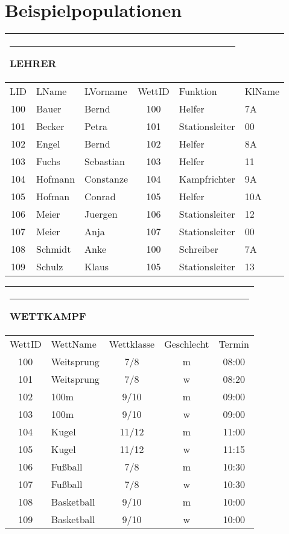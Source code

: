 \documentclass[pagesize,11pt,twoside]{scrartcl}
\def\TabKopf#1#2{\multicolumn{#2}{l}{\rule{1em}{0ex}\rule{0cm}{2.73ex}\textbf{#1}}\\\hline}
\begin{document}
\section{Beispielpopulationen}
\vspace*{-3ex}
\footnotesize\setlength{\tabcolsep}{2pt}
\begin{tabular}[t]{cllcll}
\TabKopf{LEHRER}{5}
LID&LName&LVorname&WettID&Funktion&KlName\\\hline
100&Bauer&Bernd		&100&Helfer	&7A\\
101&Becker&Petra	&101&Stationsleiter&00\\
102&Engel&Bernd		&102&Helfer	&8A\\
103&Fuchs&Sebastian	&103&Helfer	&11\\
104&Hofmann&Constanze	&104&Kampfrichter	&9A\\
105&Hofman&Conrad	&105&Helfer	&10A\\
106&Meier&Juergen	&106&Stationsleiter&12\\
107&Meier&Anja		&107&Stationsleiter&00\\
108&Schmidt&Anke	&100&Schreiber	&7A\\
109&Schulz&Klaus	&105&Stationsleiter&13
\end{tabular}\hfill
\begin{tabular}[t]{clccc}
\TabKopf{WETTKAMPF}{5}
 WettID&WettName&Wettklasse&Geschlecht&Termin\\\hline
100&Weitsprung&7/8&m&08:00\\
101&Weitsprung&7/8&w&08:20\\
102&100m&9/10&m&09:00\\
103&100m&9/10&w&09:00\\
104&Kugel&11/12&m&11:00\\
105&Kugel&11/12&w&11:15\\
106&Fußball&7/8&m&10:30\\
107&Fußball&7/8&w&10:30\\
108&Basketball&9/10&m&10:00\\
109&Basketball&9/10&w&10:00
\end{tabular}
\end{document}
